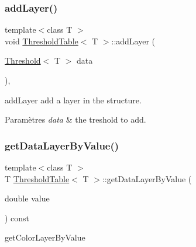 \subsubsection{\texorpdfstring{add\+Layer()}{addLayer()}\hspace{0.1cm}{\footnotesize\ttfamily [2/2]}}
{\footnotesize\ttfamily template$<$class T $>$ \\
void \hyperlink{class_threshold_table}{Threshold\+Table}$<$ T $>$\+::add\+Layer (\begin{DoxyParamCaption}\item[{\hyperlink{struct_threshold}{Threshold}$<$ T $>$}]{data }\end{DoxyParamCaption})\hspace{0.3cm}{\ttfamily [inline]}, {\ttfamily [private]}}



add\+Layer add a layer in the structure. 


\begin{DoxyParams}{Paramètres}
{\em data} & the treshold to add. \\
\hline
\end{DoxyParams}
\mbox{\label{class_threshold_table_a4d666178969016311a474841e4538a71}} 
\subsubsection{\texorpdfstring{get\+Data\+Layer\+By\+Value()}{getDataLayerByValue()}}
{\footnotesize\ttfamily template$<$class T $>$ \\
T \hyperlink{class_threshold_table}{Threshold\+Table}$<$ T $>$\+::get\+Data\+Layer\+By\+Value (\begin{DoxyParamCaption}\item[{double}]{value }\end{DoxyParamCaption}) const\hspace{0.3cm}{\ttfamily [inline]}}



get\+Color\+Layer\+By\+Value 


